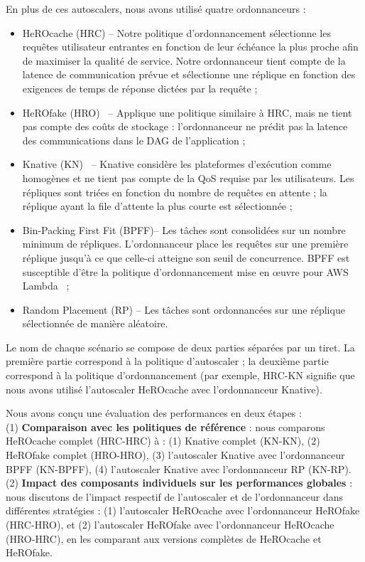 En plus de ces autoscalers, nous avons utilisé quatre ordonnanceurs :

\begin{itemize}
    \item HeROcache (HRC) -- Notre politique d'ordonnancement sélectionne les requêtes utilisateur entrantes en fonction de leur échéance la plus proche afin de maximiser la qualité de service. Notre ordonnanceur tient compte de la latence de communication prévue et sélectionne une réplique en fonction des exigences de temps de réponse dictées par la requête ;
    \item HeROfake (HRO)~\cite{herofake} -- Applique une politique similaire à HRC, mais ne tient pas compte des coûts de stockage : l'ordonnanceur ne prédit pas la latence des communications dans le DAG de l'application ;
    \item Knative (KN)~\cite{knative} -- Knative considère les plateformes d'exécution comme homogènes et ne tient pas compte de la QoS requise par les utilisateurs. Les répliques sont triées en fonction du nombre de requêtes en attente ; la réplique ayant la file d'attente la plus courte est sélectionnée ;
    \item Bin-Packing First Fit (BPFF)-- Les tâches sont consolidées sur un nombre minimum de répliques. L'ordonnanceur place les requêtes sur une première réplique jusqu'à ce que celle-ci atteigne son seuil de concurrence. BPFF est susceptible d'être la politique d'ordonnancement mise en œuvre pour AWS Lambda~\cite{wangPeekingCurtainsServerlessb} ;
    \item Random Placement (RP) -- Les tâches sont ordonnancées sur une réplique sélectionnée de manière aléatoire.
\end{itemize}

Le nom de chaque scénario se compose de deux parties séparées par un tiret. La première partie correspond à la politique d'autoscaler ; la deuxième partie correspond à la politique d'ordonnancement (par exemple, HRC-KN signifie que nous avons utilisé l'autoscaler HeROcache avec l'ordonnanceur Knative).

Nous avons conçu une évaluation des performances en deux étapes : \\
(1) \textbf{Comparaison avec les politiques de référence} : nous comparons HeROcache complet (HRC-HRC) à : (1) Knative complet (KN-KN), (2) HeROfake complet (HRO-HRO), (3) l'autoscaler Knative avec l'ordonnanceur BPFF (KN-BPFF), (4) l'autoscaler Knative avec l'ordonnanceur RP (KN-RP). \\
(2) \textbf{Impact des composants individuels sur les performances globales} : nous discutons de l'impact respectif de l'autoscaler et de l'ordonnanceur dans différentes stratégies : (1) l'autoscaler HeROcache avec l'ordonnanceur HeROfake (HRC-HRO), et (2) l'autoscaler HeROfake avec l'ordonnanceur HeROcache (HRO-HRC), en les comparant aux versions complètes de HeROcache et HeROfake.

